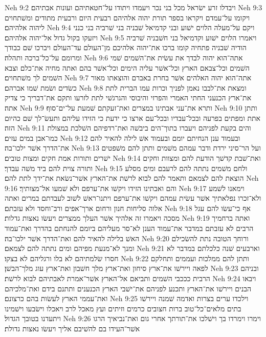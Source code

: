 Neh 9:2  ויבדלו זרע ישׂראל מכל בני נכר ויעמדו ויתודו על־חטאתיהם ועונות אבתיהם׃
Neh 9:3  ויקומו על־עמדם ויקראו בספר תורת יהוה אלהיהם רבעית היום ורבעית מתודים ומשׁתחוים ליהוה אלהיהם׃
Neh 9:4  ויקם על־מעלה הלוים ישׁוע ובני קדמיאל שׁבניה בני שׁרביה בני כנני ויזעקו בקול גדול אל־יהוה אלהיהם׃
Neh 9:5  ויאמרו הלוים ישׁוע וקדמיאל בני חשׁבניה שׁרביה הודיה שׁבניה פתחיה קומו ברכו את־יהוה אלהיכם מן־העולם עד־העולם ויברכו שׁם כבודך ומרומם על־כל־ברכה ותהלה׃
Neh 9:6  אתה־הוא יהוה לבדך את עשׂית את־השׁמים שׁמי השׁמים וכל־צבאם הארץ וכל־אשׁר עליה הימים וכל־אשׁר בהם ואתה מחיה את־כלם וצבא השׁמים לך משׁתחוים׃
Neh 9:7  אתה־הוא יהוה האלהים אשׁר בחרת באברם והוצאתו מאור כשׂדים ושׂמת שׁמו אברהם׃
Neh 9:8  ומצאת את־לבבו נאמן לפניך וכרות עמו הברית לתת את־ארץ הכנעני החתי האמרי והפרזי והיבוסי והגרגשׁי לתת לזרעו ותקם את־דבריך כי צדיק אתה׃
Neh 9:9  ותרא את־עני אבתינו במצרים ואת־זעקתם שׁמעת על־ים־סוף׃
Neh 9:10  ותתן אתת ומפתים בפרעה ובכל־עבדיו ובכל־עם ארצו כי ידעת כי הזידו עליהם ותעשׂ־לך שׁם כהיום הזה׃
Neh 9:11  והים בקעת לפניהם ויעברו בתוך־הים ביבשׁה ואת־רדפיהם השׁלכת במצולת כמו־אבן במים עזים׃
Neh 9:12  ובעמוד ענן הנחיתם יומם ובעמוד אשׁ לילה להאיר להם את־הדרך אשׁר ילכו־בה׃
Neh 9:13  ועל הר־סיני ירדת ודבר עמהם משׁמים ותתן להם משׁפטים ישׁרים ותורות אמת חקים ומצות טובים׃
Neh 9:14  ואת־שׁבת קדשׁך הודעת להם ומצוות וחקים ותורה צוית להם ביד משׁה עבדך׃
Neh 9:15  ולחם משׁמים נתתה להם לרעבם ומים מסלע הוצאת להם לצמאם ותאמר להם לבוא לרשׁת את־הארץ אשׁר־נשׂאת את־ידך לתת להם׃
Neh 9:16  והם ואבתינו הזידו ויקשׁו את־ערפם ולא שׁמעו אל־מצותיך׃
Neh 9:17  וימאנו לשׁמע ולא־זכרו נפלאתיך אשׁר עשׂית עמהם ויקשׁו את־ערפם ויתנו־ראשׁ לשׁוב לעבדתם במרים ואתה אלוה סליחות חנון ורחום ארך־אפים ורב־וחסד ולא עזבתם׃
Neh 9:18  אף כי־עשׂו להם עגל מסכה ויאמרו זה אלהיך אשׁר העלך ממצרים ויעשׂו נאצות גדלות׃
Neh 9:19  ואתה ברחמיך הרבים לא עזבתם במדבר את־עמוד הענן לא־סר מעליהם ביומם להנחתם בהדרך ואת־עמוד האשׁ בלילה להאיר להם ואת־הדרך אשׁר ילכו־בה׃
Neh 9:20  ורוחך הטובה נתת להשׂכילם ומנך לא־מנעת מפיהם ומים נתתה להם לצמאם׃
Neh 9:21  וארבעים שׁנה כלכלתם במדבר לא חסרו שׂלמתיהם לא בלו ורגליהם לא בצקו׃
Neh 9:22  ותתן להם ממלכות ועממים ותחלקם לפאה ויירשׁו את־ארץ סיחון ואת־ארץ מלך חשׁבון ואת־ארץ עוג מלך־הבשׁן׃
Neh 9:23  ובניהם הרבית כככבי השׁמים ותביאם אל־הארץ אשׁר־אמרת לאבתיהם לבוא לרשׁת׃
Neh 9:24  ויבאו הבנים ויירשׁו את־הארץ ותכנע לפניהם את־ישׁבי הארץ הכנענים ותתנם בידם ואת־מלכיהם ואת־עממי הארץ לעשׂות בהם כרצונם׃
Neh 9:25  וילכדו ערים בצרות ואדמה שׁמנה ויירשׁו בתים מלאים־כל־טוב ברות חצובים כרמים וזיתים ועץ מאכל לרב ויאכלו וישׂבעו וישׁמינו ויתעדנו בטובך הגדול׃
Neh 9:26  וימרו וימרדו בך וישׁלכו את־תורתך אחרי גום ואת־נביאיך הרגו אשׁר־העידו בם להשׁיבם אליך ויעשׂו נאצות גדולת׃
